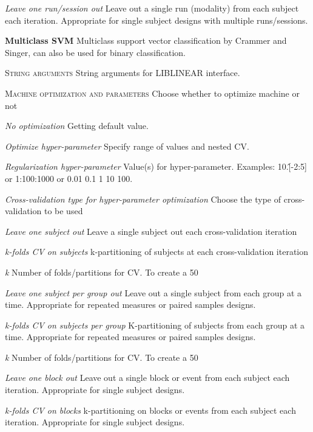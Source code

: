 \textit{Leave one run/session out}
Leave out a single run (modality) from each subject each iteration. Appropriate for single subject designs with multiple runs/sessions.


\textbf{Multiclass SVM}
Multiclass support vector classification by Crammer and Singer, can also be used for binary classification.


\textsc{String arguments}
String arguments for LIBLINEAR interface.


\textsc{Machine optimization and parameters}
Choose whether to optimize machine or not


\textsl{No optimization}
Getting default value.


\textsl{Optimize hyper-parameter}
Specify range of values and nested CV.


\textit{Regularization hyper-parameter}
Value(s) for hyper-parameter. Examples: 10.\^[-2:5] or 1:100:1000 or 0.01 0.1 1 10 100.


\textit{Cross-validation type for hyper-parameter optimization}
Choose the type of cross-validation to be used


\textit{Leave one subject out}
Leave a single subject out each cross-validation iteration


\textit{k-folds CV on subjects}
k-partitioning of subjects at each cross-validation iteration


\textit{k}
Number of folds/partitions for CV. To create a 50%


\textit{Leave one subject per group out}
Leave out a single subject from each group at a time. Appropriate for repeated measures or paired samples designs.


\textit{k-folds CV on subjects per group}
K-partitioning of subjects from each group at a time. Appropriate for repeated measures or paired samples designs.


\textit{k}
Number of folds/partitions for CV. To create a 50%


\textit{Leave one block out}
Leave out a single block or event from each subject each iteration. Appropriate for single subject designs.


\textit{k-folds CV on blocks}
k-partitioning on blocks or events from each subject each iteration. Appropriate for single subject designs.


